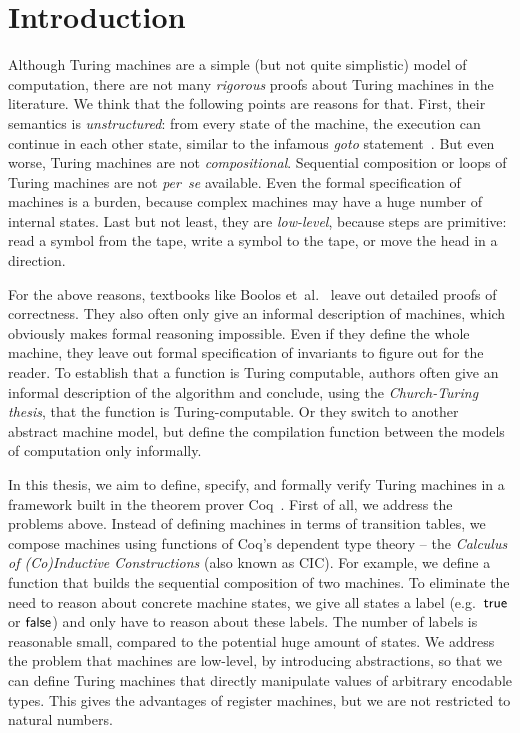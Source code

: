 \chapter{Introduction}
\label{chap:intro}


Although Turing machines are a simple (but not quite simplistic) model of computation, there are not many \textit{rigorous} proofs about Turing
machines in the literature.  We think that the following points are reasons for that.  First, their semantics is \textit{unstructured}: from every
state of the machine, the execution can continue in each other state, similar to the infamous \textit{goto} statement~\cite{dijkstra2002go}.  But even
worse, Turing machines are not \textit{compositional}.  Sequential composition or loops of Turing machines are not \textit{per~se} available.  Even
the formal specification of machines is a burden, because complex machines may have a huge number of internal states.  Last but not least, they are
\textit{low-level}, because steps are primitive: read a symbol from the tape, write a symbol to the tape, or move the head in a direction.

For the above reasons, textbooks like Boolos et~al.~\cite{boolos2007computability} leave out detailed proofs of correctness.  They also often only
give an informal description of machines, which obviously makes formal reasoning impossible.  Even if they define the whole machine, they leave out
formal specification of invariants to figure out for the reader.  To establish that a function is Turing computable, authors often give an informal
description of the algorithm and conclude, using the \textit{Church-Turing thesis}, that the function is Turing-computable. Or they switch to another
abstract machine model, but define the compilation function between the models of computation only informally.

In this thesis, we aim to define, specify, and formally verify Turing machines in a framework built in the theorem prover Coq~\cite{Coq}.  First of
all, we address the problems above.  Instead of defining machines in terms of transition tables, we compose machines using functions of Coq's
dependent type theory -- the \textit{Calculus of (Co)Inductive Constructions} (also known as CIC).  For example, we define a function that builds the
sequential composition of two machines.  To eliminate the need to reason about concrete machine states, we give all states a label (e.g.\ $\mathsf{true}$ or
$\mathsf{false}$) and only have to reason about these labels.  The number of labels is reasonable small, compared to the potential huge amount of states.  We
address the problem that machines are low-level, by introducing abstractions, so that we can define Turing machines that directly manipulate values of
arbitrary encodable types.  This gives the advantages of register machines, but we are not restricted to natural numbers.

